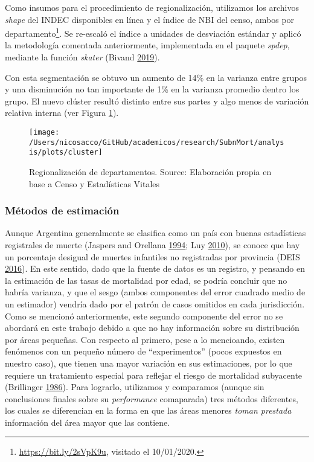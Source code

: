 \documentclass[12pt,]{article}
\begin{document}
Como insumos para el procedimiento de regionalización, utilizamos los
archivos \emph{shape} del INDEC disponibles en línea y el índice de NBI
del censo, ambos por departamento\footnote{\url{https://bit.ly/2sVpK9u},
  visitado el 10/01/2020.}. Se re-escaló el índice a unidades de
desviación estándar y aplicó la metodología comentada anteriormente,
implementada en el paquete \emph{spdep}, mediante la función
\emph{skater} (Bivand \protect\hyperlink{ref-Bivand2019}{2019}).

Con esta segmentación se obtuvo un aumento de 14\% en la varianza entre
grupos y una disminución no tan importante de 1\% en la varianza
promedio dentro los grupo. El nuevo clúster resultó distinto entre sus
partes y algo menos de variación relativa interna (ver Figura
\ref{fig:cluster}).

\begin{figure}

{\centering \texttt{[image: /Users/nicosacco/GitHub/academicos/research/SubnMort/analysis/plots/cluster]} 

}

\caption{Regionalización de departamentos. Source: Elaboración propia en base a Censo y Estadísticas Vitales}\label{fig:cluster}
\end{figure}

\hypertarget{muxe9todos-de-estimaciuxf3n}{%
\subsubsection{Métodos de
estimación}\label{muxe9todos-de-estimaciuxf3n}}

Aunque Argentina generalmente se clasifica como un país con buenas
estadísticas registrales de muerte (Jaspers and Orellana
\protect\hyperlink{ref-JaspersOrellana1994}{1994}; Luy
\protect\hyperlink{ref-Luy2010}{2010}), se conoce que hay un porcentaje
desigual de muertes infantiles no registradas por provincia (DEIS
\protect\hyperlink{ref-DEIS2016}{2016}). En este sentido, dado que la
fuente de datos es un registro, y pensando en la estimación de las tasas
de mortalidad por edad, se podría concluir que no habría varianza, y que
el sesgo (ambos componentes del error cuadrado medio de un estimador)
vendría dado por el patrón de casos omitidos en cada jurisdicción. Como
se mencionó anteriormente, este segundo componente del error no se
abordará en este trabajo debido a que no hay información sobre su
distribución por áreas pequeñas. Con respecto al primero, pese a lo
mencioando, existen fenómenos con un pequeño número de ``experimentos''
(pocos expuestos en nuestro caso), que tienen una mayor variación en sus
estimaciones, por lo que requiere un tratamiento especial para reflejar
el riesgo de mortalidad subyacente (Brillinger
\protect\hyperlink{ref-Brillinger1986}{1986}). Para lograrlo, utilizamos
y comparamos (aunque sin conclusiones finales sobre su
\emph{performance} comaparada) tres métodos diferentes, los cuales se
diferencian en la forma en que las áreas menores \emph{toman prestada}
información del área mayor que las contiene.
\end{document}
